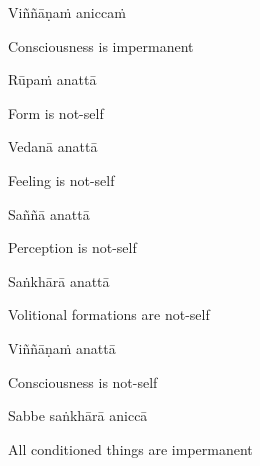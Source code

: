 Viññāṇaṁ aniccaṁ

\begin{english}
  Consciousness is impermanent\ifdigitalversion\makeatletter\hyperlink{endnote19-appendix}\makeatother\fi
\end{english}

Rūpaṁ anattā

\begin{english}
  Form is not-self
\end{english}

Vedanā anattā

\begin{english}
  Feeling is not-self
\end{english}

Saññā anattā

\begin{english}
  Perception is not-self
\end{english}

Saṅkhārā anattā

\begin{english}
  Volitional formations are not-self\ifdigitalversion\makeatletter\hyperlink{endnote20-appendix}\makeatother\fi
\end{english}

Viññāṇaṁ anattā

\begin{english}
  Consciousness is not-self\ifdigitalversion\thinspace\makeatletter\hyperlink{endnote21-appendix}\makeatother\fi
\end{english}

Sabbe saṅkhārā aniccā

\begin{english}
  All conditioned things are impermanent\ifdigitalversion\makeatletter\hyperlink{endnote22-appendix}\makeatother\fi
\end{english}

